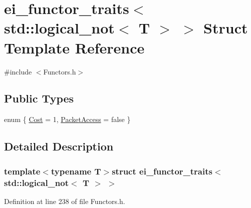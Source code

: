 \hypertarget{structei__functor__traits_3_01std_1_1logical__not_3_01_t_01_4_01_4}{\section{ei\-\_\-functor\-\_\-traits$<$ std\-:\-:logical\-\_\-not$<$ T $>$ $>$ Struct Template Reference}
\label{structei__functor__traits_3_01std_1_1logical__not_3_01_t_01_4_01_4}
}


{\ttfamily \#include $<$Functors.\-h$>$}

\subsection*{Public Types}
\begin{DoxyCompactItemize}
\item 
enum \{ \hyperlink{structei__functor__traits_3_01std_1_1logical__not_3_01_t_01_4_01_4_a9a637edbef389fb23272216e5712c8b1a6d0d96b257f6ff894cc68fb0d37f3232}{Cost} = 1, 
\hyperlink{structei__functor__traits_3_01std_1_1logical__not_3_01_t_01_4_01_4_a9a637edbef389fb23272216e5712c8b1a391bba040009bbce5ada6963db8161e4}{Packet\-Access} = false
 \}
\end{DoxyCompactItemize}


\subsection{Detailed Description}
\subsubsection*{template$<$typename T$>$struct ei\-\_\-functor\-\_\-traits$<$ std\-::logical\-\_\-not$<$ T $>$ $>$}



Definition at line 238 of file Functors.\-h.



